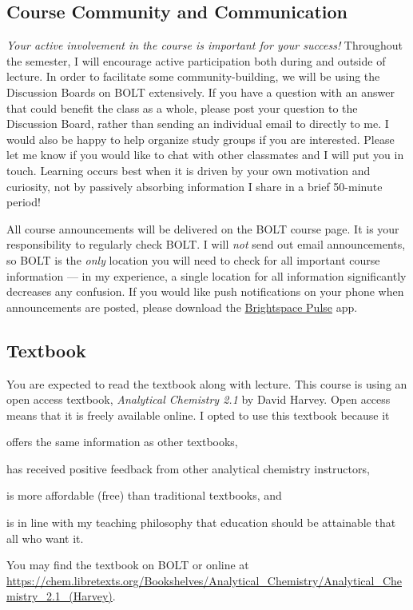 \documentclass[11pt,letterpaper]{article}
\begin{document}
\subsection{Course Community and Communication}
\emph{Your active involvement in the course is important for your success!}
Throughout the semester, I will encourage active participation both during and
outside of lecture. In order to facilitate some community-building, we will be
using the Discussion Boards on BOLT extensively. If you have a question with an
answer that could benefit the class as a whole, please post your question to the
Discussion Board, rather than sending an individual email to directly to me. I
would also be happy to help organize study groups if you are interested. Please
let me know if you would like to chat with other classmates and I will put you
in touch. Learning occurs best when it is driven by your own motivation and
curiosity, not by passively absorbing information I share in a brief 50-minute
period!

All course announcements will be delivered on the BOLT course page. It is your
responsibility to regularly check BOLT. I will \emph{not} send out email
announcements, so BOLT is the \emph{only} location you will need to check for
all important course information --- in my experience, a single location for all
information significantly decreases any confusion. If you would like push
notifications on your phone when announcements are posted, please download the
\href{https://documentation.brightspace.com/EN/brightspace/requirements/all/pulse.htm}{Brightspace
Pulse} app.

\subsection{Textbook}
You are expected to read the textbook along with lecture. This course is using an open access
textbook, \textit{Analytical Chemistry 2.1} by David Harvey. Open access means
that it is freely available online. I opted to use this textbook because it
\begin{enumerate*}[label={(\arabic*)}]
	\item offers the same information as other textbooks,
	\item has received positive feedback from other analytical chemistry
		instructors,
	\item is more affordable (free) than traditional textbooks, and
	\item is in line with my teaching philosophy that education should be
		attainable that all who want it.
\end{enumerate*}
You may find the textbook on BOLT or online at
\url{https://chem.libretexts.org/Bookshelves/Analytical_Chemistry/Analytical_Chemistry_2.1_(Harvey)}.
\end{document}
